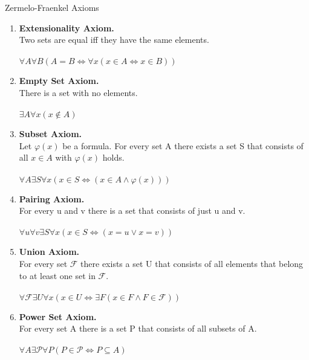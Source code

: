 \begin{definition}{Zermelo-Fraenkel Axioms}{}
   \begin{enumerate}
        \item \textbf{Extensionality Axiom.}\\
        Two sets are equal iff they have the same elements.\\
        \\
        $\forall A \forall B \left(A=B \iff \forall x \left(x \in A \iff x \in B\right)\right)$ \\
        \item \textbf{Empty Set Axiom.} \\
        There is a set with no elements.\\
        \\
        $\exists A \forall x (x \notin A)$\\
        \item \textbf{Subset Axiom.} \\
        Let $\varphi(x)$ be a formula. For every set A there exists a set S that consists of all $x \in A$ with $\varphi(x)$ holds.\\
        \\
        $\forall A \exists S \forall x (x \in S \iff (x \in A \wedge \varphi(x))) $\\
        \item \textbf{Pairing Axiom.}\\
        For every u and v there is a set that consists of just u and v.\\
        \\
        $\forall u \forall v \exists S \forall x (x \in S \iff (x = u \vee x = v)) $\\
        
        \item \textbf{Union Axiom.}\\
        For every set $\mathcal{F}$ there exists a set U that consists of all elements that belong to at least one set in $\mathcal{F}$.\\
        \\
        $\forall \mathcal{F} \exists U \forall x (x \in U \iff \exists F (x \in F \wedge F \in \mathcal{F}))$\\
        \item \textbf{Power Set Axiom.}\\
        For every set A there is a set P that consists of all subsets of A.\\
        \\
        $\forall A \exists \mathcal{P} \forall P (P \in \mathcal{P} \iff P \subseteq A)$
   \end{enumerate} 
\end{definition}

